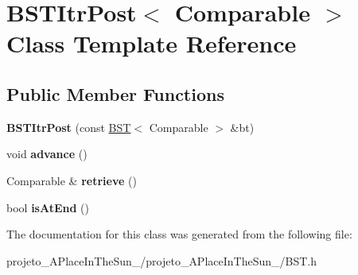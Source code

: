 \hypertarget{class_b_s_t_itr_post}{}\section{B\+S\+T\+Itr\+Post$<$ Comparable $>$ Class Template Reference}
\label{class_b_s_t_itr_post}
\subsection*{Public Member Functions}
\begin{DoxyCompactItemize}
\item 
\hypertarget{class_b_s_t_itr_post_acf7e537dea01978f40c40909c55c56c2}{}\label{class_b_s_t_itr_post_acf7e537dea01978f40c40909c55c56c2} 
{\bfseries B\+S\+T\+Itr\+Post} (const \hyperlink{class_b_s_t}{B\+ST}$<$ Comparable $>$ \&bt)
\item 
\hypertarget{class_b_s_t_itr_post_a376098e5a82cd02118dd4dcdec49bb26}{}\label{class_b_s_t_itr_post_a376098e5a82cd02118dd4dcdec49bb26} 
void {\bfseries advance} ()
\item 
\hypertarget{class_b_s_t_itr_post_a72446e4d0df0bcafc14294a78faeb56e}{}\label{class_b_s_t_itr_post_a72446e4d0df0bcafc14294a78faeb56e} 
Comparable \& {\bfseries retrieve} ()
\item 
\hypertarget{class_b_s_t_itr_post_a2f330e73bb817e8bd1c797805e66ddb7}{}\label{class_b_s_t_itr_post_a2f330e73bb817e8bd1c797805e66ddb7} 
bool {\bfseries is\+At\+End} ()
\end{DoxyCompactItemize}


The documentation for this class was generated from the following file\+:\begin{DoxyCompactItemize}
\item 
projeto\+\_\+\+A\+Place\+In\+The\+Sun\+\_/projeto\+\_\+\+A\+Place\+In\+The\+Sun\+\_/B\+S\+T.\+h\end{DoxyCompactItemize}

